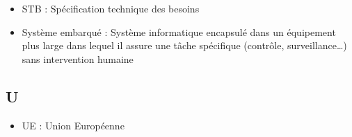 \documentclass[a4paper]{article}
\begin{document}
\begin{itemize}
\item STB : Spécification technique des besoins
\item Système embarqué : Système informatique encapsulé dans un équipement plus large dans
lequel il assure une tâche spécifique (contrôle, surveillance…) sans
intervention humaine
\end{itemize}

\subsection{U}

\begin{itemize}
\item UE : Union Européenne
\end{itemize}
\end{document}
